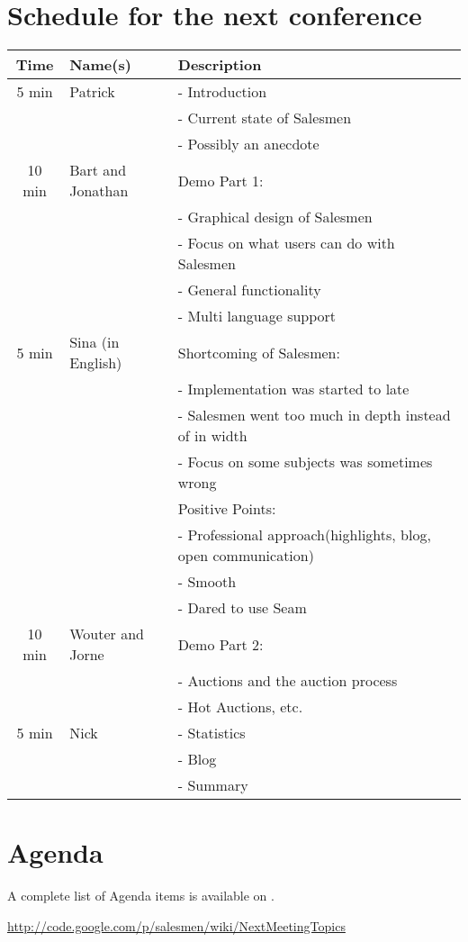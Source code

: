 \documentclass[a4paper, 12pt]{article}
\begin{document}
	\section{Schedule for the next conference}
			\begin{tabular}{c | l | p{10cm} }
				\textbf{Time} & \textbf{Name(s)} & \textbf{Description} \\
				\hline
				5 min & Patrick & - Introduction \\
				& & - Current state of Salesmen \\
				& & - Possibly an anecdote \\
				\hline
				10 min & Bart and Jonathan & Demo Part 1: \\
				& & - Graphical design of Salesmen \\
				& & - Focus on what users can do with Salesmen \\
				& & - General functionality \\
				& & - Multi language support \\
				\hline
				5 min & Sina (in English) & Shortcoming of Salesmen:  \\
				& & - Implementation was started to late \\
				& & - Salesmen went too much in depth instead of in width \\
				& & - Focus on some subjects was sometimes wrong \\
				& & Positive Points: \\
				& & - Professional approach(highlights, blog, open communication) \\
				& & - Smooth \\
				& & - Dared to use Seam \\
				\hline
				10 min & Wouter and Jorne & Demo Part 2: \\
				& & - Auctions and the auction process \\
				& & - Hot Auctions, etc. \\
				\hline
				5 min & Nick & - Statistics \\
				& & - Blog \\
				& & - Summary \\
			\end{tabular}
		\section{Agenda}
A complete list of Agenda items is available on \cite{agendaitems}.\\
	
	\begin{thebibliography}{99}
		
		\href{http://code.google.com/p/salesmen/wiki/NextMeetingTopics}{http://code.google.com/p/salesmen/wiki/NextMeetingTopics}

		
	\end{thebibliography}	
		
\end{document}
